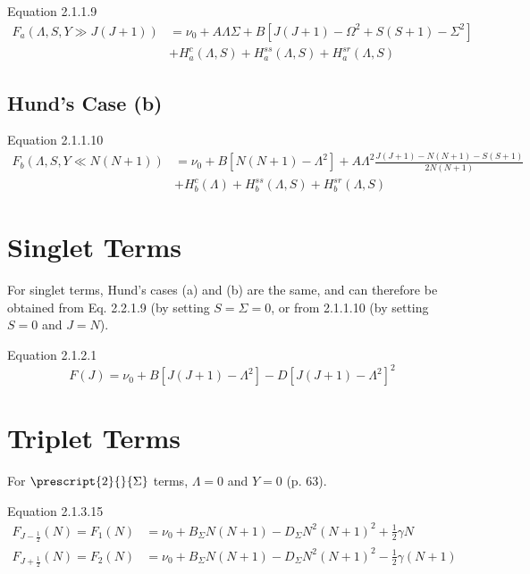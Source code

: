 \documentclass[11pt, twoside, fleqn]{report}
\newcommand{\state}[2]{\prescript{#1}{}{#2}}
\begin{document}
Equation 2.1.1.9
\begin{align*}
    F_{a}(\Lambda, S, Y \gg J(J + 1)) & = \nu_{0} + A\Lambda\Sigma + B[J(J + 1) - \Omega^{2} + S(S + 1) -\Sigma^{2}] \\
                                      & + H_{a}^{c}(\Lambda, S) + H_{a}^{ss}(\Lambda, S) + H_{a}^{sr}(\Lambda, S)
\end{align*}

\subsection{Hund's Case (b)}

Equation 2.1.1.10
\begin{align*}
    F_{b}(\Lambda, S, Y \ll N(N + 1)) & = \nu_{0} + B[N(N + 1) - \Lambda^{2}] + A\Lambda^{2}\frac{J(J + 1) - N(N + 1) - S(S + 1)}{2N(N + 1)} \\
                                      & + H_{b}^{c}(\Lambda) + H_{b}^{ss}(\Lambda, S) + H_{b}^{sr}(\Lambda, S)
\end{align*}

\section{Singlet Terms}

For singlet terms, Hund's cases (a) and (b) are the same, and can therefore be obtained from Eq. 2.2.1.9 (by setting $S = \Sigma = 0$, or from 2.1.1.10 (by setting $S = 0$ and $J = N$).

Equation 2.1.2.1
\begin{equation*}
    F(J) = \nu_{0} + B[J(J + 1) - \Lambda^{2}] - D[J(J + 1) - \Lambda^{2}]^{2}
\end{equation*}

\section{Triplet Terms}

For $\state{2}{\Sigma}$ terms, $\Lambda = 0$ and $Y = 0$ (p. 63).

Equation 2.1.3.15
\begin{align*}
    F_{J - \tfrac{1}{2}}(N) = F_{1}(N) & = \nu_{0} + B_\Sigma N(N + 1) - D_\Sigma N^{2}(N + 1)^{2} + \tfrac{1}{2}\gamma N      \\
    F_{J + \tfrac{1}{2}}(N) = F_{2}(N) & = \nu_{0} + B_\Sigma N(N + 1) - D_\Sigma N^{2}(N + 1)^{2} - \tfrac{1}{2}\gamma(N + 1)
\end{align*}
\end{document}
